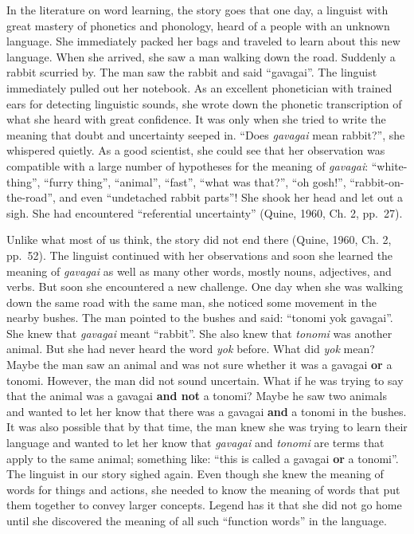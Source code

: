 \documentclass[oneside]{report}
\theoremstyle{definition}
\theoremstyle{definition}
\theoremstyle{definition}
\theoremstyle{remark}
\begin{document}
In the literature on word learning, the story goes that one day, a
linguist with great mastery of phonetics and phonology, heard of a
people with an unknown language. She immediately packed her bags and
traveled to learn about this new language. When she arrived, she saw a
man walking down the road. Suddenly a rabbit scurried by. The man saw
the rabbit and said ``gavagai''. The linguist immediately pulled out her
notebook. As an excellent phonetician with trained ears for detecting
linguistic sounds, she wrote down the phonetic transcription of what she
heard with great confidence. It was only when she tried to write the
meaning that doubt and uncertainty seeped in. ``Does \emph{gavagai} mean
rabbit?'', she whispered quietly. As a good scientist, she could see
that her observation was compatible with a large number of hypotheses
for the meaning of \emph{gavagai}: ``white-thing'', ``furry thing'',
``animal'', ``fast'', ``what was that?'', ``oh gosh!'',
``rabbit-on-the-road'', and even ``undetached rabbit parts''! She shook
her head and let out a sigh. She had encountered ``referential
uncertainty'' (Quine, 1960, Ch. 2, pp.~27).

Unlike what most of us think, the story did not end there (Quine, 1960,
Ch. 2, pp.~52). The linguist continued with her observations and soon
she learned the meaning of \emph{gavagai} as well as many other words,
mostly nouns, adjectives, and verbs. But soon she encountered a new
challenge. One day when she was walking down the same road with the same
man, she noticed some movement in the nearby bushes. The man pointed to
the bushes and said: ``tonomi yok gavagai''. She knew that
\emph{gavagai} meant ``rabbit''. She also knew that \emph{tonomi} was
another animal. But she had never heard the word \emph{yok} before. What
did \emph{yok} mean? Maybe the man saw an animal and was not sure
whether it was a gavagai \textbf{or} a tonomi. However, the man did not
sound uncertain. What if he was trying to say that the animal was a
gavagai \textbf{and not} a tonomi? Maybe he saw two animals and wanted
to let her know that there was a gavagai \textbf{and} a tonomi in the
bushes. It was also possible that by that time, the man knew she was
trying to learn their language and wanted to let her know that
\emph{gavagai} and \emph{tonomi} are terms that apply to the same
animal; something like: ``this is called a gavagai \textbf{or} a
tonomi''. The linguist in our story sighed again. Even though she knew
the meaning of words for things and actions, she needed to know the
meaning of words that put them together to convey larger concepts.
Legend has it that she did not go home until she discovered the meaning
of all such ``function words'' in the language.
\end{document}
